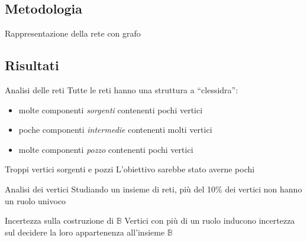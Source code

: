 \documentclass[8pt]{beamer}
\begin{document}
\subsection{Metodologia}

\begin{frame}{Rappresentazione della rete con grafo}
\end{frame}

\subsection{Risultati}

\begin{frame}{Analisi delle reti}
Tutte le reti hanno una struttura a ``clessidra'':
\begin{itemize}
\item molte componenti \emph{sorgenti} contenenti pochi vertici
\item poche componenti \emph{intermedie} contenenti molti vertici
\item molte componenti \emph{pozzo} contenenti pochi vertici
\end{itemize}
\pause
\begin{alertblock}{Troppi vertici sorgenti e pozzi}
  L'obiettivo sarebbe stato averne pochi
\end{alertblock}
\end{frame}

\begin{frame}{Analisi dei vertici}
  Studiando un insieme di reti, pi\`u del 10\% dei vertici non hanno
  un ruolo univoco
  \pause
  \begin{alertblock}{Incertezza sulla costruzione di $\mathbb{B}$}
    Vertici con pi\`u di un ruolo inducono incertezza sul decidere la
    loro appartenenza all'insieme $\mathbb{B}$
  \end{alertblock}
\end{frame}
\end{document}
